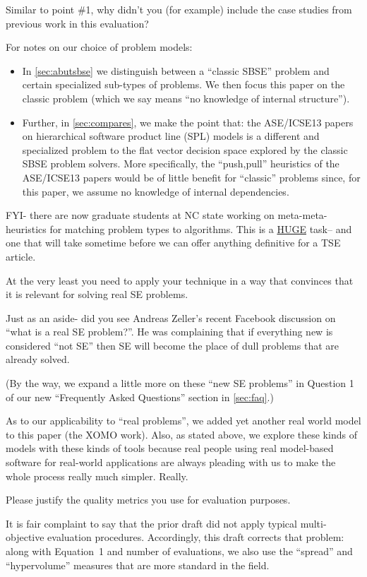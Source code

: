 \documentclass[10pt,journal,compsoc]{IEEEtran}
\newcommand{\bi}{\begin{itemize}}
\newcommand{\ei}{\end{itemize}}
\newcommand{\tion}[1]{\textsection\ref{sec:#1}}
\newenvironment{changed}{\par\color{MyDarkBlue}}{\par}
\begin{document}
Similar to point \#1, why didn't you (for
example) include the case studies from previous work
in this evaluation?  
\begin{changed}
For notes on our choice of problem models:
\bi
\item
In \tion{abutsbse} we distinguish between a  ``classic SBSE'' problem
and certain specialized sub-types of problems. 
We then focus this paper on the classic problem (which we say means
``no knowledge of internal structure'').
\item
Further, 
in
\tion{compares}, we make the point that:
the ASE/ICSE13
papers on hierarchical software product line (SPL)
models is a different and specialized problem to the flat vector
decision space explored by the classic SBSE  problem solvers.
More specifically, 
the ``push,pull'' heuristics of the
ASE/ICSE13 papers would be of little benefit for ``classic'' problems
since, for this paper, we assume
no knowledge of internal dependencies.
\ei
FYI- there are now graduate students at NC state
working on meta-meta-heuristics for matching problem
types to algorithms. This is a \underline{HUGE}
task-- and one that will take sometime
before we can offer anything definitive for a TSE
article.  
\end{changed}
At the very least you need to
apply your technique in a way that convinces that it
is relevant for solving real SE problems.
\begin{changed}
Just as an aside- did you see Andreas Zeller's recent Facebook
discussion on ``what is a real SE problem?''. He was complaining that
if everything new is considered ``not SE'' then SE will become the
place of dull problems that are already solved.

(By the way, we expand a little more on these ``new SE problems'' in Question 1
of our new ``Frequently Asked Questions'' section in \tion{faq}.)

As to our applicability to ``real problems'',
we added yet another real world model to this paper (the XOMO work).
Also, as stated above, we explore these kinds of models
with these kinds of tools because
real people using real model-based software for real-world
applications are always pleading with us to make the whole
process really much simpler. Really.


\end{changed}


Please justify the quality metrics you use for evaluation purposes.

\begin{changed}
It is fair complaint to say that the prior draft did not apply
typical multi-objective evaluation procedures.   Accordingly, this draft corrects that problem: along with Equation~1
and number of evaluations, we also use the ``spread'' and ``hypervolume'' measures that are more standard
in the field.





\end{changed}
\end{document}
